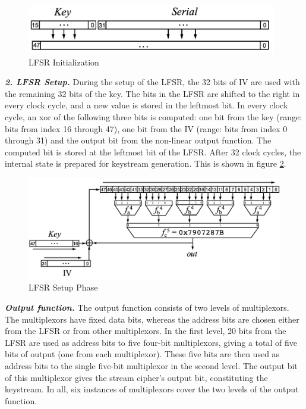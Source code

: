 \begin{figure}[ht!]
	\centering
		\includegraphics[width=4.3in]{./figures/hitag2-1.PNG}
	\caption{LFSR Initialization}	
	\label{fig:hitag2-1}
\end{figure}

\noindent \textit{\textbf{2. LFSR Setup.}} During the setup of the LFSR, the 32 bits of IV are used with the remaining 32 bits of the key. The bits in the LFSR are shifted to the right in every clock cycle, and a new value is stored in the leftmost bit. In every clock cycle, an xor of the following three bits is computed: one bit from the key (range: bits from index 16 through 47), one bit from the IV (range: bits from index 0 through 31) and the output bit from the non-linear output function. The computed bit is stored at the leftmost bit of the LFSR. After 32 clock cycles, the internal state is prepared for keystream generation. This is shown in figure \ref{fig:hitag2-2}.\\

\begin{figure}[ht!]
	\centering
		\includegraphics[width=5.5in]{./figures/hitag2-2.PNG}
	\caption{LFSR Setup Phase}	
	\label{fig:hitag2-2}
\end{figure}

\noindent \textit{\textbf{Output function.}} The output function consists of two levels of multiplexors. The multiplexors have fixed data bits, whereas the address bits are chosen either from the LFSR or from other multiplexors. In the first level, 20 bits from the LFSR are used as address bits to five four-bit multiplexors, giving a total of five bits of output (one from each multiplexor). These five bits are then used as address bits to the single five-bit multiplexor in the second level. The output bit of this multiplexor gives the stream cipher's output bit, constituting the keystream. In all, six instances of multiplexors cover the two levels of the output function.

